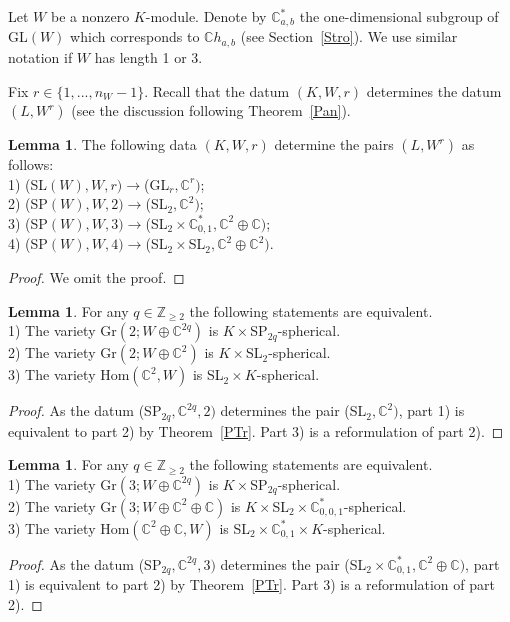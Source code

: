 \documentclass[12pt]{amsart}
\theoremstyle{definition}\newtheorem{theorem}{Theorem}[section]
\newtheorem{lemma}[proposition]{Lemma}
\theoremstyle{definition}\newtheorem{definition}[proposition]{Definition}
\theoremstyle{remark}\newtheorem{example}[proposition]{Example}
\renewcommand{\to}[1][]{\xrightarrow{#1}}
\begin{document}
Let $W$ be a nonzero $K$-module. Denote by $\mathbb C^*_{a, b}$ the one-dimensional subgroup of GL$(W)$ which corresponds to $\mathbb Ch_{a,b}$ (see Section~\ref{Stro}). We use similar notation if $W$ has length 1 or 3.

Fix $r\in\{1,..., n_W-1\}$. Recall that the datum $(K, W, r)$ determines the datum $(L, W^r)$ (see the discussion following Theorem~\ref{Pan}).
\begin{lemma}The following data $(K,W,r)$ determine the pairs $(L, W^r)$ as follows:\\1) (SL$(W), W, r)\to$(GL$_r, \mathbb C^r)$;\\2) (SP$(W), W, 2)\to$(SL$_2, \mathbb C^2)$;\\3) (SP$(W), W, 3)\to$(SL$_2\times\mathbb C^*_{0,1}, \mathbb C^2\oplus\mathbb C)$;\\4) (SP$(W), W, 4)\to$(SL$_2\times$SL$_2, \mathbb C^2\oplus\mathbb C^2)$.\end{lemma}
\begin{proof}We omit the proof.\end{proof}
\begin{lemma} For any $q\in\mathbb Z_{\ge2}$ the following statements are equivalent.\\1) The variety Gr$(2; W\oplus\mathbb C^{2q})$ is $K\times$SP$_{2q}$-spherical.\\2) The variety Gr$(2; W\oplus\mathbb C^2)$ is $K\times$SL$_2$-spherical.\\3) The variety Hom$(\mathbb C^2, W)$ is SL$_2\times K$-spherical.\end{lemma}
\begin{proof} As the datum (SP$_{2q}, \mathbb C^{2q}, 2)$ determines the pair (SL$_2, \mathbb C^2)$, part 1) is equivalent to part 2) by Theorem~\ref{PTr}. Part 3) is a reformulation of part 2).\end{proof}
\begin{lemma}\label{Lsp3} For any $q\in\mathbb Z_{\ge2}$ the following statements are equivalent.\\1) The variety Gr$(3; W\oplus\mathbb C^{2q})$ is $K\times$SP$_{2q}$-spherical.\\2) The variety Gr$(3;W\oplus\mathbb C^2\oplus\mathbb C)$ is $K\times$SL$_2\times\mathbb C^*_{0,0,1}$-spherical.\\3) The variety Hom$(\mathbb C^2\oplus\mathbb C, W)$ is SL$_2\times\mathbb C^*_{0,1}\times K$-spherical.\end{lemma}
\begin{proof} As the datum (SP$_{2q}, \mathbb C^{2q}, 3)$ determines the pair (SL$_2\times\mathbb C^*_{0,1}, \mathbb C^2\oplus\mathbb C)$, part 1) is equivalent to part 2) by Theorem~\ref{PTr}. Part 3) is a reformulation of part 2).\end{proof}
\end{document}
